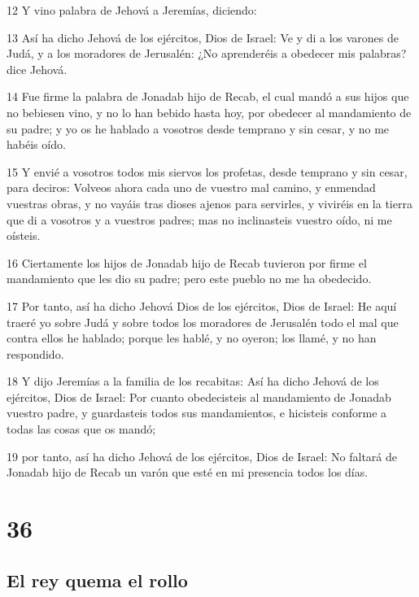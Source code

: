 \par 12 Y vino palabra de Jehová a Jeremías, diciendo:
\par 13 Así ha dicho Jehová de los ejércitos, Dios de Israel: Ve y di a los varones de Judá, y a los moradores de Jerusalén: ¿No aprenderéis a obedecer mis palabras? dice Jehová.
\par 14 Fue firme la palabra de Jonadab hijo de Recab, el cual mandó a sus hijos que no bebiesen vino, y no lo han bebido hasta hoy, por obedecer al mandamiento de su padre; y yo os he hablado a vosotros desde temprano y sin cesar, y no me habéis oído.
\par 15 Y envié a vosotros todos mis siervos los profetas, desde temprano y sin cesar, para deciros: Volveos ahora cada uno de vuestro mal camino, y enmendad vuestras obras, y no vayáis tras dioses ajenos para servirles, y viviréis en la tierra que di a vosotros y a vuestros padres; mas no inclinasteis vuestro oído, ni me oísteis.
\par 16 Ciertamente los hijos de Jonadab hijo de Recab tuvieron por firme el mandamiento que les dio su padre; pero este pueblo no me ha obedecido.
\par 17 Por tanto, así ha dicho Jehová Dios de los ejércitos, Dios de Israel: He aquí traeré yo sobre Judá y sobre todos los moradores de Jerusalén todo el mal que contra ellos he hablado; porque les hablé, y no oyeron; los llamé, y no han respondido.
\par 18 Y dijo Jeremías a la familia de los recabitas: Así ha dicho Jehová de los ejércitos, Dios de Israel: Por cuanto obedecisteis al mandamiento de Jonadab vuestro padre, y guardasteis todos sus mandamientos, e hicisteis conforme a todas las cosas que os mandó;
\par 19 por tanto, así ha dicho Jehová de los ejércitos, Dios de Israel: No faltará de Jonadab hijo de Recab un varón que esté en mi presencia todos los días.

\chapter{36}

\section*{El rey quema el rollo}

